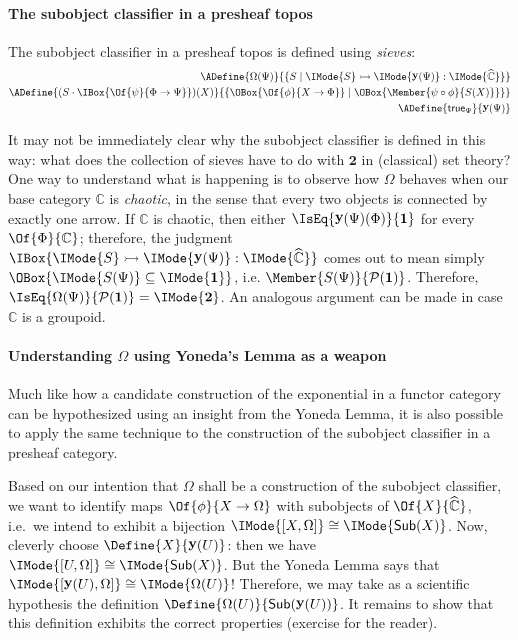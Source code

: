 \documentclass{article}
\DeclareMathOperator\OpYoneda{\mathbf{y}}
\newcommand\Yoneda[1]{\OpYoneda({#1})}
\newcommand\Psh[1]{\widehat{#1}}
\newcommand\IsSubobject[3]{\IMode{#1}\rightarrowtail\IMode{#2}:\IMode{#3}}
\newcommand\IsSubsetEq[2]{\IMode{#1}\subseteq\IMode{#2}}
\newcommand\One{\mathbf{1}}
\newcommand\Two{\mathbf{2}}
\newcommand\IsEquiv[2]{\IMode{#1}\cong\IMode{#2}}
\newcommand\True{\mathsf{true}}
\newcommand\MkSet[1]{\{#1\}}
\newcommand\Pow[1]{\mathcal{P} (#1)}
\newcommand\Sub[1]{\mathsf{Sub} (#1)}
\begin{document}
\paragraph{The subobject classifier in a presheaf topos}

The subobject classifier in a presheaf topos is defined using
\emph{sieves}:
\begin{align*}
  \ADefine{
    \Omega(\Psi)
  }{
    \MkSet{
      S \mid \IsSubobject{S}{\Yoneda{\Psi}}{\Psh{\mathbb{C}}}
    }
  }
  \\
  \ADefine{
    (S\cdot\IBox{\Of{\psi}{\Phi\to\Psi}})(X)
  }{
    \MkSet{
      \OBox{
        \Of{\phi}{X\to\Phi}
      }
      \mid
      \OBox{
        \Member{\psi\circ\phi}{S(X)}
      }
    }
  }
  \\
  \ADefine{
    \True_\Psi
  }{
    \Yoneda{\Psi}
  }
\end{align*}

\begin{remark}
  It may not be immediately clear why the subobject classifier is
  defined in this way: what does the collection of sieves have to do
  with $\Two$ in (classical) set theory? One way to understand what is
  happening is to observe how $\Omega$ behaves when our base category
  $\mathbb{C}$ is \emph{chaotic}, in the sense that every two objects
  is connected by exactly one arrow.
%
  If $\mathbb{C}$ is chaotic, then either
  $\IsEq{\Yoneda{\Psi}(\Phi)}{\One}$ for every
  $\Of{\Phi}{\mathbb{C}}$; therefore, the judgment
  $\IBox{\IsSubobject{S}{\Yoneda{\Psi}}{\Psh{\mathbb{C}}}}$ comes out
  to mean simply $\OBox{\IsSubsetEq{S(\Psi)}{\One}}$,
  i.e. $\Member{S(\Psi)}{\Pow{\One}}$. Therefore,
  $\IsEq{\Omega(\Psi)}{\Pow{\One}}=\IMode{\Two}$. An analogous
  argument can be made in case $\mathbb{C}$ is a groupoid.
\end{remark}

\paragraph{Understanding $\Omega$ using Yoneda's Lemma as a weapon}
Much like how a candidate construction of the exponential in a functor
category can be hypothesized using an insight from the Yoneda Lemma,
it is also possible to apply the same technique to the construction of
the subobject classifier in a presheaf category.

Based on our intention that $\Omega$ shall be a construction of the
subobject classifier, we want to identify maps $\Of{\phi}{X\to\Omega}$
with subobjects of $\Of{X}{\Psh{\mathbb{C}}}$, i.e.\ we intend to
exhibit a bijection $\IsEquiv{[X,\Omega]}{\Sub{X}}$.
%
Now, cleverly choose $\Define{X}{\Yoneda{U}}$: then we have
$\IsEquiv{[U,\Omega]}{\Sub{X}}$. But the Yoneda Lemma says that
$\IsEquiv{[\Yoneda{U},\Omega]}{\Omega(U)}$! Therefore, we may take as
a scientific hypothesis the definition
$\Define{\Omega(U)}{\Sub{\Yoneda{U}}}$. It remains to show that this
definition exhibits the correct properties (exercise for the reader).
\end{document}
